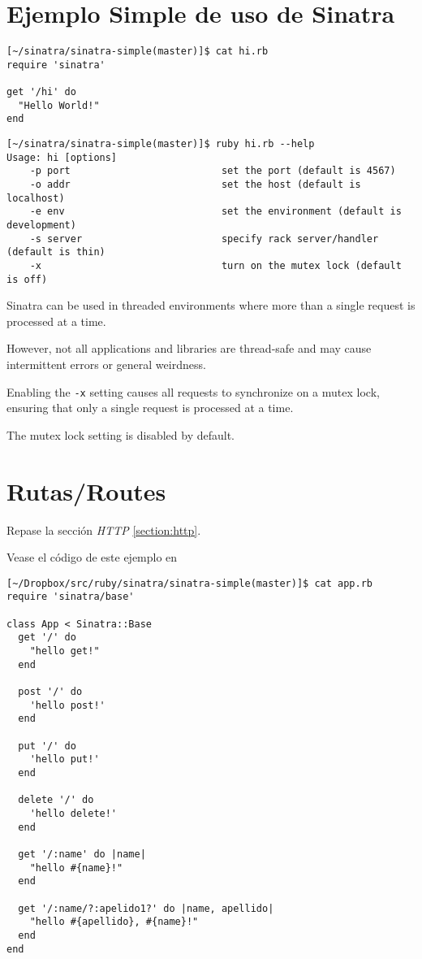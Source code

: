 \section{Ejemplo Simple de uso de Sinatra}

\begin{verbatim}
[~/sinatra/sinatra-simple(master)]$ cat hi.rb 
require 'sinatra'

get '/hi' do
  "Hello World!"
end
\end{verbatim}

\begin{verbatim}
[~/sinatra/sinatra-simple(master)]$ ruby hi.rb --help
Usage: hi [options]
    -p port                          set the port (default is 4567)
    -o addr                          set the host (default is localhost)
    -e env                           set the environment (default is development)
    -s server                        specify rack server/handler (default is thin)
    -x                               turn on the mutex lock (default is off)
\end{verbatim}
Sinatra can be used in threaded environments where more than a
single request is processed at a time. 

However, not all applications
and libraries are thread-safe and may cause intermittent errors or
general weirdness. 

Enabling the \verb|-x| setting causes all requests
to synchronize on a mutex lock, ensuring that only a single request
is processed at a time.

The mutex lock setting is disabled by default.

\section{Rutas/Routes}\label{routes}

Repase la sección
{\it HTTP}
\ref{section:http}.

Vease el código de este ejemplo en 

\begin{verbatim}
[~/Dropbox/src/ruby/sinatra/sinatra-simple(master)]$ cat app.rb
require 'sinatra/base'

class App < Sinatra::Base
  get '/' do
    "hello get!"
  end

  post '/' do
    'hello post!'
  end

  put '/' do
    'hello put!'
  end

  delete '/' do
    'hello delete!'
  end

  get '/:name' do |name|
    "hello #{name}!"
  end

  get '/:name/?:apelido1?' do |name, apellido|
    "hello #{apellido}, #{name}!"
  end
end
\end{verbatim}


